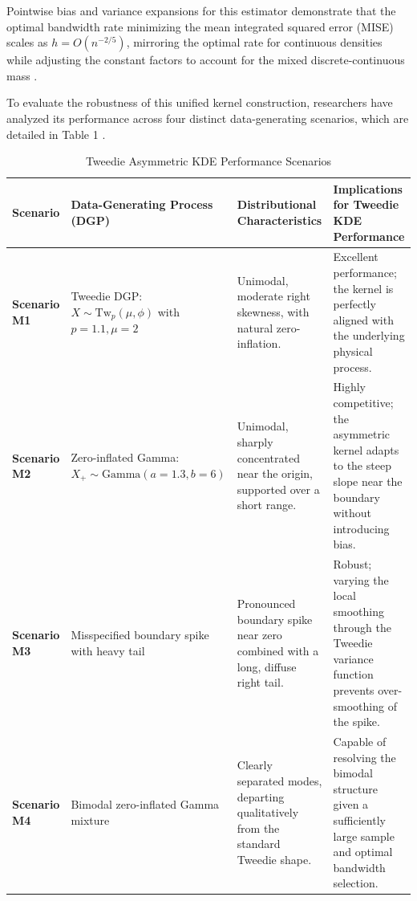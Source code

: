 Pointwise bias and variance expansions for this estimator demonstrate that the optimal bandwidth rate minimizing the mean integrated squared error (MISE) scales as $h = O(n^{-2/5})$, mirroring the optimal rate for continuous densities while adjusting the constant factors to account for the mixed discrete-continuous mass \cite{tweedie_kde, tweedie1984}.

To evaluate the robustness of this unified kernel construction, researchers have analyzed its performance across four distinct data-generating scenarios, which are detailed in Table 1 \cite{boundary_correction}.

\begin{table}[htbp]
\centering
\small
\begin{tabularx}{\textwidth}{l p{3.2cm} X X}
\toprule
\textbf{Scenario} & \textbf{Data-Generating Process (DGP)} & \textbf{Distributional Characteristics} & \textbf{Implications for Tweedie KDE Performance} \\
\midrule
\textbf{Scenario M1} \cite{boundary_correction} & Tweedie DGP: $X \sim \text{Tw}_p(\mu, \phi)$ with $p=1.1, \mu=2$ & Unimodal, moderate right skewness, with natural zero-inflation. \cite{boundary_correction} & Excellent performance; the kernel is perfectly aligned with the underlying physical process. \cite{boundary_correction} \\
\addlinespace
\textbf{Scenario M2} \cite{boundary_correction} & Zero-inflated Gamma: $X_+ \sim \text{Gamma}(a=1.3, b=6)$ & Unimodal, sharply concentrated near the origin, supported over a short range. \cite{boundary_correction} & Highly competitive; the asymmetric kernel adapts to the steep slope near the boundary without introducing bias. \cite{tweedie_kde, boundary_correction} \\
\addlinespace
\textbf{Scenario M3} \cite{boundary_correction} & Misspecified boundary spike with heavy tail & Pronounced boundary spike near zero combined with a long, diffuse right tail. \cite{boundary_correction} & Robust; varying the local smoothing through the Tweedie variance function prevents over-smoothing of the spike. \cite{tweedie_kde, boundary_correction} \\
\addlinespace
\textbf{Scenario M4} \cite{boundary_correction} & Bimodal zero-inflated Gamma mixture & Clearly separated modes, departing qualitatively from the standard Tweedie shape. \cite{boundary_correction} & Capable of resolving the bimodal structure given a sufficiently large sample and optimal bandwidth selection. \cite{tweedie_kde, boundary_correction} \\
\bottomrule
\end{tabularx}
\caption{Tweedie Asymmetric KDE Performance Scenarios}
\label{tab:tweedie_scenarios}
\end{table}

